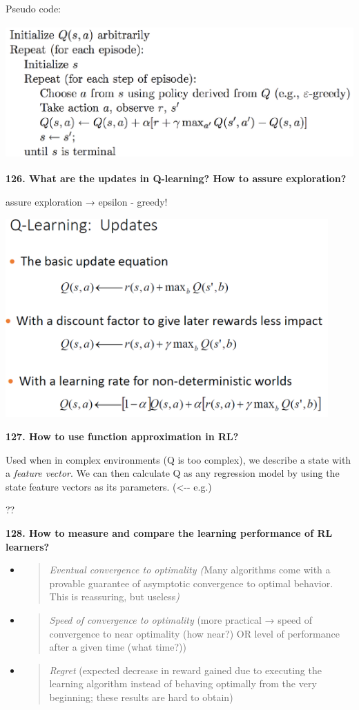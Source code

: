 Pseudo code:

\includegraphics[width=5.45737in,height=2.02158in]{media/image14.png}

\textbf{126. What are the updates in Q-learning? How to assure
exploration?}

assure exploration → epsilon - greedy!

\includegraphics[width=4.86979in,height=3.00024in]{media/image4.png}

\textbf{127. How to use function approximation in RL?}

Used when in complex environments (Q is too complex), we describe a
state with a \emph{feature vector}. We can then calculate Q as any
regression model by using the state feature vectors as its parameters.
(\textless-\/- e.g.)

??

\textbf{128. How to measure and compare the learning performance of RL
learners?}

\begin{itemize}
\item
  \begin{quote}
  \textit{Eventual convergence to optimality (}Many algorithms come
  with a provable guarantee of asymptotic convergence to optimal
  behavior. This is reassuring, but useless\textit{)}
  \end{quote}
\item
  \begin{quote}
  \textit{Speed of convergence to optimality} (more practical → speed
  of convergence to near optimality (how near?) OR level of performance
  after a given time (what time?))
  \end{quote}
\item
  \begin{quote}
  \textit{Regret} (expected decrease in reward gained due to
  executing the learning algorithm instead of behaving optimally from
  the very beginning; these results are hard to obtain)
  \end{quote}
\end{itemize}
